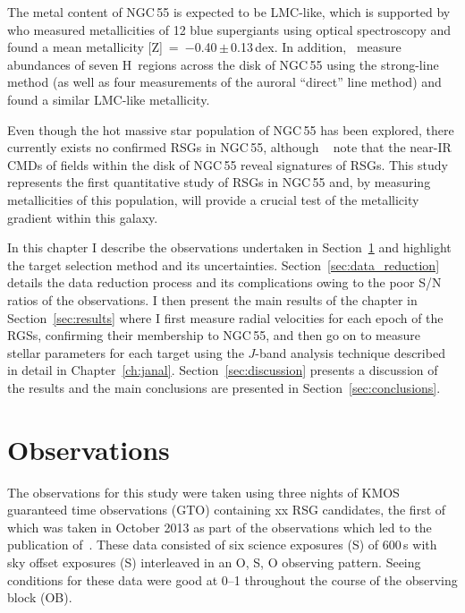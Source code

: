 The metal content of NGC\,55 is expected to be LMC-like, which is supported by~\cite{2012A&A...542A..79C} who measured metallicities of 12 blue supergiants using optical spectroscopy and found a mean metallicity [Z]~=~$-$0.40\,$\pm$\,0.13\,dex.
In addition,~\cite{1983MNRAS.204..743W} measure abundances of seven H\,\2 regions across the disk of NGC\,55 using the strong-line method (as well as four measurements of the auroral ``direct'' line method) and found a similar LMC-like metallicity.

Even though the hot massive star population of NGC\,55 has been explored,
there currently exists no confirmed RSGs in NGC\,55, although ~\cite{2005ApJ...622..279D} note that the near-IR CMDs of fields within the disk of NGC\,55 reveal signatures of RSGs.
This study represents the first quantitative study of RSGs in NGC\,55 and, by measuring metallicities of this population, will provide a crucial test of the metallicity gradient within this galaxy.

In this chapter I describe the observations undertaken in Section~\ref{sec:obs} and highlight the target selection method and its uncertainties.
Section~\ref{sec:data_reduction} details the data reduction process and its complications owing to the poor S/N ratios of the observations.
I then present the main results of the chapter in Section~\ref{sec:results} where I first measure radial velocities for each epoch of the RGSs, confirming their membership to NGC\,55, and then go on to measure stellar parameters for each target using the $J$-band analysis technique described in detail in Chapter~\ref{ch:janal}.
Section~\ref{sec:discussion} presents a discussion of the results and the main conclusions are presented in Section~\ref{sec:conclusions}.


\section{Observations} %
\label{sec:obs}

The observations for this study were taken using three nights of KMOS guaranteed time observations (GTO) containing xx RSG candidates, the first of which was taken in October 2013 as part of the observations which led to the publication of~\cite{2015ApJ...805..182G}.
These data consisted of six science exposures (S) of 600\,s with sky offset exposures (S) interleaved in an O, S, O observing pattern.
Seeing conditions for these data were good at 0--1 throughout the course of the observing block (OB).

